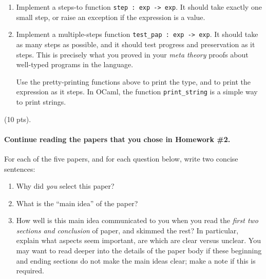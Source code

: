 \documentclass[11pt]{article}
\newcounter{question}[section]
\newcounter{taskcounter}
\newcounter{taskPercentCounter}
\newcommand{\task}[1]
  {\bigskip \noindent {\bf Task\addtocounter{taskPercentCounter}{#1} \arabic{taskcounter}\addtocounter{taskcounter}{1}} (#1 pts).}
\begin{document}
\begin{enumerate}

\item Implement a steps-to function \texttt{step : exp -> exp}. It
  should take exactly one small step, or raise an exception if the
  expression is a value.

\item Implement a multiple-steps function \texttt{test\_pap : exp ->
  exp}. It should take as many steps as possible, and it should test
  progress and preservation as it steps.  This is precisely what you
  proved in your \emph{meta theory} proofs about well-typed programs
  in the language.  
  
  Use the pretty-printing functions above to print the type, and to
  print the expression as it steps.  In OCaml, the function
  \texttt{print\_string} is a simple way to print strings.

%
\end{enumerate}

\task{10} \paragraph{Continue reading the papers that you chose in Homework \#2.}

For each of the five papers, and for each question below, write two concise sentences:
\begin{enumerate}
\item Why did \emph{you} select this paper?
\item What is the ``main idea'' of the paper?
\item How well is this main idea communicated to you when you read the
  \emph{first two sections and conclusion} of paper, and skimmed the
  rest?  In particular, explain what aspects seem important, are which
  are clear versus unclear.  You may want to read deeper into the
  details of the paper body if these beginning and ending sections do
  not make the main ideas clear; make a note if this is required.
\end{enumerate}
\end{document}
